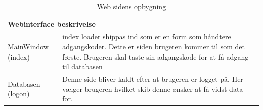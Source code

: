 \begin{table}[H]
\centering
\begin{tabular}{p{3cm} p{12.5cm}}
\multicolumn{2}{l}{{\Large Webinterface beskrivelse}} \\\hline
MainWindow (index) & index loader shippas ind som er en form som håndtere adgangskoder. Dette er siden brugeren kommer til som det første. Brugeren skal taste sin adgangskode for at få adgang til databasen\\
Databasen (logon) & Denne side bliver kaldt efter at brugeren er logget på. Her vælger brugeren hvilket skib denne ønsker at få vidst data for.\\
\end{tabular}
\caption{Web sidens opbygning}
\label{tabel:webside-simpel}
\end{table}

